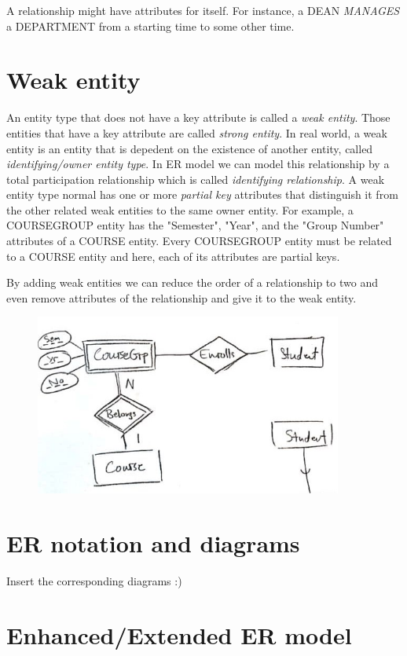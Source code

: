 A relationship might have attributes for itself. For instance, a DEAN \textit{MANAGES} a DEPARTMENT from a starting time to some other time. 

\section{Weak entity}
An entity type that does not have a key attribute is called a \textit{weak entity}. Those entities that have a key attribute are called \textit{strong entity}. In real world, a weak entity is an entity that is depedent on the existence of another entity, called \textit{identifying/owner entity type}. In ER model we can model this relationship by a total participation relationship which is called \textit{identifying relationship}. A weak entity type normal has one or more \textit{partial key} attributes that distinguish it from the other related weak entities to the same owner entity. For example, a COURSEGROUP entity has the "Semester", "Year", and the "Group Number" attributes of a COURSE entity. Every COURSEGROUP entity must be related to a COURSE entity and here, each of its attributes are partial keys.

By adding weak entities we can reduce the order of a relationship to two and even remove attributes of the relationship and give it to the weak entity.
\begin{figure}
    \centering
    \includegraphics[width = 0.9\textwidth]{Graphics/weak entity.jpg}
\end{figure}
\section{ER notation and diagrams}
Insert the corresponding diagrams :)

\section{Enhanced/Extended ER model}
